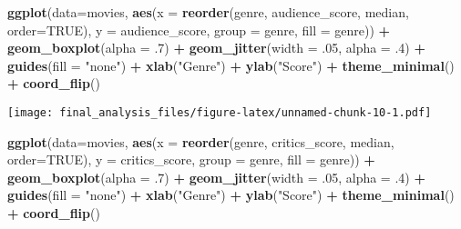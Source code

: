 \documentclass[]{article}
\newenvironment{Shaded}{\begin{snugshade}}{\end{snugshade}}
\newcommand{\KeywordTok}[1]{\textcolor[rgb]{0.13,0.29,0.53}{\textbf{#1}}}
\newcommand{\DataTypeTok}[1]{\textcolor[rgb]{0.13,0.29,0.53}{#1}}
\newcommand{\DecValTok}[1]{\textcolor[rgb]{0.00,0.00,0.81}{#1}}
\newcommand{\StringTok}[1]{\textcolor[rgb]{0.31,0.60,0.02}{#1}}
\newcommand{\OtherTok}[1]{\textcolor[rgb]{0.56,0.35,0.01}{#1}}
\newcommand{\OperatorTok}[1]{\textcolor[rgb]{0.81,0.36,0.00}{\textbf{#1}}}
\newcommand{\NormalTok}[1]{#1}
\begin{document}
\begin{Shaded}
\begin{Highlighting}[]
\KeywordTok{ggplot}\NormalTok{(}\DataTypeTok{data=}\NormalTok{movies, }\KeywordTok{aes}\NormalTok{(}\DataTypeTok{x =} \KeywordTok{reorder}\NormalTok{(genre, audience_score, median, }\DataTypeTok{order=}\OtherTok{TRUE}\NormalTok{), }\DataTypeTok{y =}\NormalTok{ audience_score, }\DataTypeTok{group =}\NormalTok{ genre, }\DataTypeTok{fill =}\NormalTok{ genre)) }\OperatorTok{+}
\StringTok{  }\KeywordTok{geom_boxplot}\NormalTok{(}\DataTypeTok{alpha =}\NormalTok{ .}\DecValTok{7}\NormalTok{) }\OperatorTok{+}
\StringTok{  }\KeywordTok{geom_jitter}\NormalTok{(}\DataTypeTok{width =}\NormalTok{ .}\DecValTok{05}\NormalTok{, }\DataTypeTok{alpha =}\NormalTok{ .}\DecValTok{4}\NormalTok{) }\OperatorTok{+}
\StringTok{  }\KeywordTok{guides}\NormalTok{(}\DataTypeTok{fill =} \StringTok{"none"}\NormalTok{) }\OperatorTok{+}
\StringTok{  }\KeywordTok{xlab}\NormalTok{(}\StringTok{"Genre"}\NormalTok{) }\OperatorTok{+}
\StringTok{  }\KeywordTok{ylab}\NormalTok{(}\StringTok{"Score"}\NormalTok{) }\OperatorTok{+}
\StringTok{  }\KeywordTok{theme_minimal}\NormalTok{() }\OperatorTok{+}
\StringTok{  }\KeywordTok{coord_flip}\NormalTok{()}
\end{Highlighting}
\end{Shaded}

\texttt{[image: final\_analysis\_files/figure-latex/unnamed-chunk-10-1.pdf]}

\begin{Shaded}
\begin{Highlighting}[]
\KeywordTok{ggplot}\NormalTok{(}\DataTypeTok{data=}\NormalTok{movies, }\KeywordTok{aes}\NormalTok{(}\DataTypeTok{x =} \KeywordTok{reorder}\NormalTok{(genre, critics_score, median, }\DataTypeTok{order=}\OtherTok{TRUE}\NormalTok{), }\DataTypeTok{y =}\NormalTok{ critics_score, }\DataTypeTok{group =}\NormalTok{ genre, }\DataTypeTok{fill =}\NormalTok{ genre)) }\OperatorTok{+}
\StringTok{  }\KeywordTok{geom_boxplot}\NormalTok{(}\DataTypeTok{alpha =}\NormalTok{ .}\DecValTok{7}\NormalTok{) }\OperatorTok{+}
\StringTok{  }\KeywordTok{geom_jitter}\NormalTok{(}\DataTypeTok{width =}\NormalTok{ .}\DecValTok{05}\NormalTok{, }\DataTypeTok{alpha =}\NormalTok{ .}\DecValTok{4}\NormalTok{) }\OperatorTok{+}
\StringTok{  }\KeywordTok{guides}\NormalTok{(}\DataTypeTok{fill =} \StringTok{"none"}\NormalTok{) }\OperatorTok{+}
\StringTok{  }\KeywordTok{xlab}\NormalTok{(}\StringTok{"Genre"}\NormalTok{) }\OperatorTok{+}
\StringTok{  }\KeywordTok{ylab}\NormalTok{(}\StringTok{"Score"}\NormalTok{) }\OperatorTok{+}
\StringTok{  }\KeywordTok{theme_minimal}\NormalTok{() }\OperatorTok{+}
\StringTok{  }\KeywordTok{coord_flip}\NormalTok{()}
\end{Highlighting}
\end{Shaded}
\end{document}
